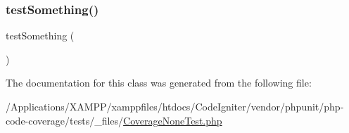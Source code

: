 \mbox{\label{class_coverage_none_test_a0fc4e17369bc9607ebdd850d9eda8167}} 
\subsubsection{\texorpdfstring{test\+Something()}{testSomething()}\hspace{0.1cm}{\footnotesize\ttfamily [2/2]}}
{\footnotesize\ttfamily test\+Something (\begin{DoxyParamCaption}{ }\end{DoxyParamCaption})}



The documentation for this class was generated from the following file\+:\begin{DoxyCompactItemize}
\item 
/\+Applications/\+X\+A\+M\+P\+P/xamppfiles/htdocs/\+Code\+Igniter/vendor/phpunit/php-\/code-\/coverage/tests/\+\_\+files/\mbox{\hyperlink{php-code-coverage_2tests_2__files_2_coverage_none_test_8php}{Coverage\+None\+Test.\+php}}\end{DoxyCompactItemize}

